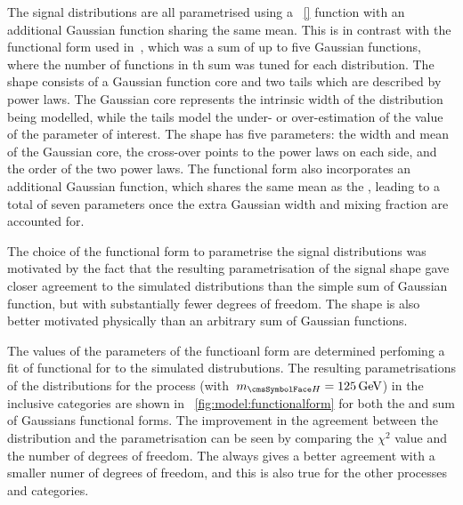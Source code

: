The signal \mgg distributions are all parametrised using a \DCB~\ref{} function with an additional Gaussian function sharing the same mean. This is in contrast with the functional form used in~\cite{HIG-16-020}, which was a sum of up to five Gaussian functions, where the number of functions in th sum was tuned for each \mgg distribution. %
The \DCB shape consists of a Gaussian function core and two tails which are described by power laws. The Gaussian core represents the intrinsic width of the distribution being modelled, while the tails model the under- or over-estimation of the value of the parameter of interest. %
The \DCB shape has five parameters: the width and mean of the Gaussian core, the cross-over points to the power laws on each side, and the order of the two power laws. The functional \DCBpG form also incorporates an additional Gaussian function, which shares the same mean as the \DCB, leading to a total of seven parameters once the extra Gaussian width and mixing fraction are accounted for. 

The choice of the \DCBpG functional form to parametrise the signal distributions was motivated by the fact that the resulting parametrisation of the signal shape gave closer agreement to the simulated distributions than the simple sum of Gaussian function, but with substantially fewer degrees of freedom. The \DCB shape is also better motivated physically than an arbitrary sum of Gaussian functions. 

The values of the parameters of the functioanl form are determined perfoming a \NLL fit of functional for to the simulated \mgg distrubutions. The resulting parametrisations of the \mgg distributions for the \ggH process (with $\mH=125\GeV$) in the inclusive categories are shown in \Fig~\ref{fig:model:functionalform} for both the \DCBpG and sum of Gaussians functional forms. The improvement in the agreement between the distribution and the parametrisation can be seen by comparing the $\chi^2$ value and the number of degrees of freedom. The \DCBpG always gives a better agreement with a smaller numer of degrees of freedom, and this is also true for the other processes and categories.

